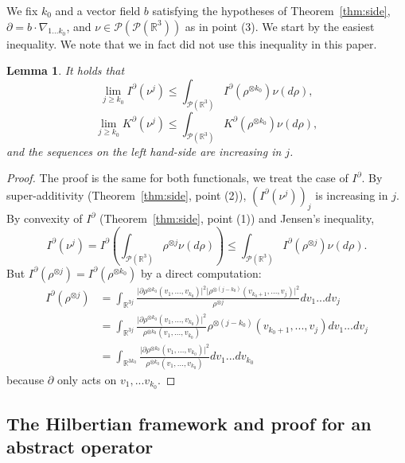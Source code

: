 \documentclass[11pt,a4paper]{article}
\theoremstyle{definition}
\theoremstyle{plain}
\newtheorem{lemma}[defi]{Lemma}
\begin{document}
We fix $k_0$ and a vector field $b$ satisfying the hypotheses of Theorem~\ref{thm:side}, $\partial=b\cdot\nabla_{1...k_0}$, and $\nu\in\mathcal{P}(\mathcal{P}(\mathbb{R}^3))$ as in point (3). We start by the easiest inequality. We note that we in fact did not use this inequality in this paper.

\begin{lemma}
\label{lem:lvl3affinityfirsthalf}
    It holds that
    $$\lim_{j\geq k_0} I^\partial(\nu^j)\leq\int_{\mathcal{P} (\mathbb{R}^3)} I^\partial(\rho^{\otimes k_0})\nu(d\rho),$$
    $$\lim_{j\geq k_0} K^\partial(\nu^j)\leq\int_{\mathcal{P} (\mathbb{R}^3)} K^\partial(\rho^{\otimes k_0})\nu(d\rho),$$
    and the sequences on the left hand-side are increasing in $j$.
\end{lemma}
\begin{proof}
    The proof is the same for both functionals, we treat the case of $I^\partial$. By super-additivity (Theorem~\ref{thm:side}, point (2)), $(I^\partial(\nu^j))_j$ is increasing in $j$.
    By convexity of $I^\partial$ (Theorem~\ref{thm:side}, point (1)) and Jensen's inequality,
    $$ I^\partial(\nu^j) = I^\partial\left( \int_{\mathcal{P} (\mathbb{R}^3)}\rho^{\otimes j}\nu(d\rho)\right)\leq\int_{\mathcal{P} (\mathbb{R}^3)}I^\partial(\rho^{\otimes j})\nu(d\rho).$$
    But $I^\partial(\rho^{\otimes j})=I^\partial(\rho^{\otimes k_0})$ by a direct computation:
    \begin{align*}
        I^\partial(\rho^{\otimes j})&=\int_{\mathbb{R}^{3j}}\frac{\vert \partial \rho^{\otimes k_0}(v_1,...,v_{k_0})\vert^2\vert \rho^{\otimes (j-k_0)}(v_{k_0+1},...,v_{j})\vert^2}{\rho^{\otimes j}} dv_1...dv_j\\
        &=\int_{\mathbb{R}^{3j}}\frac{\vert \partial \rho^{\otimes k_0}(v_1,...,v_{k_0})\vert^2}{\rho^{\otimes k_0}(v_1,...,v_{k_0})}\rho^{\otimes (j-k_0)}(v_{k_0+1},...,v_{j}) dv_1...dv_j\\
        &=\int_{\mathbb{R}^{3k_0}}\frac{\vert \partial \rho^{\otimes k_0}(v_1,...,v_{k_0})\vert^2}{\rho^{\otimes k_0}(v_1,...,v_{k_0})} dv_1...dv_{k_0}
    \end{align*}
    because $\partial$ only acts on $v_1,...v_{k_0}$.
    
\end{proof}

\subsection{The Hilbertian framework and proof for an abstract operator}
\end{document}
